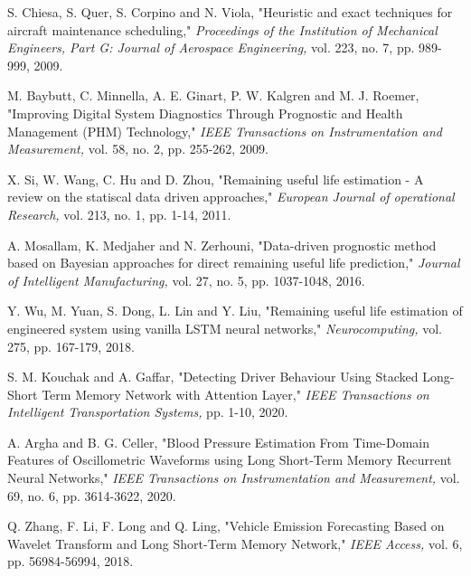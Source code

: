 \documentclass[journal]{IEEEtran}
\begin{document}
\begin{thebibliography}{10}

 S. Chiesa, S. Quer, S. Corpino and N. Viola, "Heuristic and exact techniques for aircraft maintenance scheduling," \emph{Proceedings of the Institution of Mechanical Engineers, Part G: Journal of Aerospace Engineering,} vol. 223, no. 7, pp. 989-999, 2009. 

 M. Baybutt, C. Minnella, A. E. Ginart, P. W. Kalgren and M. J. Roemer, "Improving Digital System Diagnostics Through Prognostic and Health Management (PHM) Technology," \emph{IEEE Transactions on Instrumentation and Measurement,} vol. 58, no. 2, pp. 255-262, 2009. 

X. Si, W. Wang, C. Hu and D. Zhou, "Remaining useful life estimation - A review on the statiscal data driven approaches," \emph{European Journal of operational Research,} vol. 213, no. 1, pp. 1-14, 2011. 


 A. Mosallam, K. Medjaher and N. Zerhouni, "Data-driven prognostic method based on Bayesian approaches for direct remaining useful life prediction," \emph{Journal of Intelligent Manufacturing,} vol. 27, no. 5, pp. 1037-1048, 2016. 

 Y. Wu, M. Yuan, S. Dong, L. Lin and Y. Liu, "Remaining useful life estimation of engineered system using vanilla LSTM neural networks," \emph{Neurocomputing,} vol. 275, pp. 167-179, 2018. 

S. M. Kouchak and A. Gaffar, "Detecting Driver Behaviour Using Stacked Long-Short Term Memory Network with Attention Layer," \emph{IEEE Transactions on Intelligent Transportation Systems,} pp. 1-10, 2020. 

A. Argha and B. G. Celler, "Blood Pressure Estimation From Time-Domain Features of Oscillometric Waveforms using Long Short-Term Memory Recurrent Neural Networks," \emph{IEEE Transactions on Instrumentation and Measurement,} vol. 69, no. 6, pp. 3614-3622, 2020. 

Q. Zhang, F. Li, F. Long and Q. Ling, "Vehicle Emission Forecasting Based on Wavelet Transform and Long Short-Term Memory Network," \emph{IEEE Access, }vol. 6, pp. 56984-56994, 2018. 


\end{thebibliography}
\end{document}
